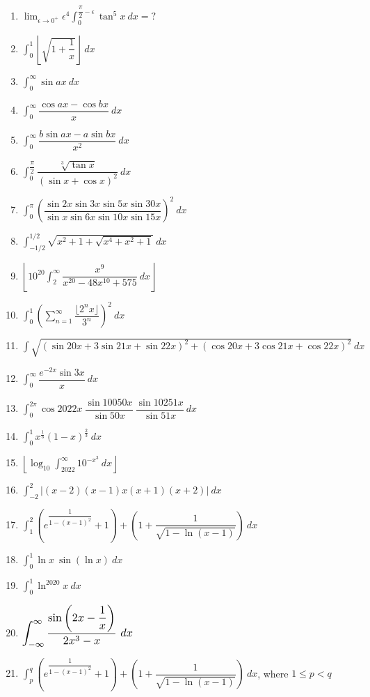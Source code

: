 \documentclass[12pt,a4paper,twoside]{book}
\newcommand{\dint}[1]{\displaystyle{\int #1 \  dx}}
\newcommand{\rint}[1]{\resizebox{4.0cm}{!}{$\dint{#1}$}}
\begin{document}
	\begin{enumerate}
	
	\item $\displaystyle{\lim_{\epsilon\rightarrow 0^+} \epsilon^4 \int_0^{\dfrac{\pi}{2}-\epsilon}\tan^5x \ dx}=?$
	\item $\dint{_0^1 \left\lfloor \sqrt{1+\dfrac{1}{x}} \right\rfloor}$
	\item $\dint{_0^\infty \sin {ax}}$
	\item $\dint{_0^\infty\dfrac{\cos{ax}-\cos{bx}}{x}}$
	\item $\dint{_0^\infty\dfrac{b\sin{ax}-a\sin{bx}}{x^2}}$
	\item $\dint{_0^{\dfrac{\pi}{2}} \dfrac{\sqrt[3]{\tan x}}{(\sin x+\cos x)^2}}$
	\item $\dint{_0^\pi \left(\dfrac{\sin{2x}\sin{3x}\sin{5x}\sin{30x}}{\sin x \sin{6x}\sin{10x}\sin{15x}}\right)^2}$
	\item $\dint{_{-1/2}^{1/2} \sqrt{x^2+1+\sqrt{x^4+x^2+1}}}$
	\item $\left\lfloor 10^{20}\dint{_2^\infty \dfrac{x^9}{x^{20}-48x^{10}+575}}\right\rfloor$
	\item $\dint{_0^1 \left( \sum_{n=1}^\infty \dfrac{\lfloor2^nx\rfloor}{3^n}\right)^2}$ 
	\item $\dint{\sqrt{(\sin{20x}+3\sin{21x}+\sin{22x})^2+(\cos{20x}+3\cos{21x}+\cos{22x})^2}}$
	\item $\dint{_0^\infty \dfrac{e^{-2x}\sin {3x}}{x}}$
	\item $\dint{_0^{2\pi}\cos{2022x}\ \dfrac{\sin{10050x}}{\sin{50x}}\ \dfrac{\sin{10251x}}{\sin{51x}}}$
	\item $\dint{_0^1 x^{\frac{1}{3}}(1-x)^{\frac{2}{3}}}$
	\item $\left\lfloor \log_{10} \dint{_{2022}^\infty 10^{-x^3}} \right\rfloor$
	\item $\dint{_{-2}^2 \left|(x-2)(x-1)x(x+1)(x+2)\right|}$
	\item $\dint{_1^2 \left(e^{\dfrac{1}{1-(x-1)^2}}+1\right)+\left(1+\dfrac{1}{\sqrt{1-\ln{(x-1)}}}\right)}$
	\item $\dint{_0^1 \ln x \ \sin{(\ln x)}}$
	\item $\dint{_0^1 \ln ^{2020} {x}}$
	\item $\rint{_{-\infty}^\infty \dfrac{\sin{\left(2x-\dfrac{1}{x}\right)}}{2x^3-x}} $
	\item $\dint{_p^q \left(e^{\dfrac{1}{1-(x-1)^2}}+1\right)+\left(1+\dfrac{1}{\sqrt{1-\ln{(x-1)}}}\right)}$, where $1\leq p<q$

\end{enumerate}
\end{document}

